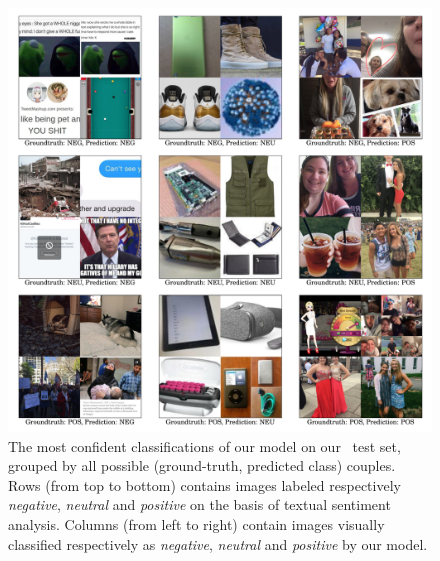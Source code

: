 \begin{figure}
\centering
\includegraphics[width=\linewidth]{confusion-images}
\caption{The most confident classifications of our model on our \BTSA\, test set, grouped by all possible (ground-truth, predicted class) couples. Rows (from top to bottom) contains images labeled respectively \emph{negative}, \emph{neutral} and \emph{positive} on the basis of textual sentiment analysis. Columns (from left to right) contain images visually classified respectively as \emph{negative}, \emph{neutral} and \emph{positive} by our model.
}
\label{fig:vsa:confusion-images}
\end{figure}

